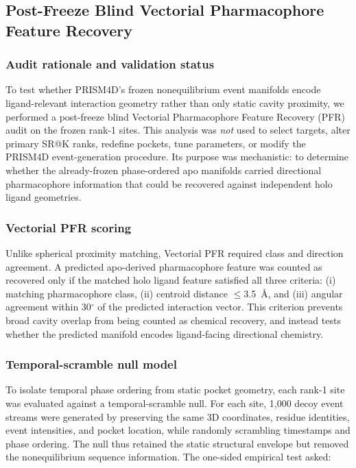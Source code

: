 \documentclass{sn-jnl}
\begin{document}
\subsection{Post-Freeze Blind Vectorial Pharmacophore Feature Recovery}
\label{sec:pfr}

\subsubsection{Audit rationale and validation status}

To test whether PRISM4D's frozen nonequilibrium event manifolds encode
ligand-relevant interaction geometry rather than only static cavity proximity,
we performed a post-freeze blind Vectorial Pharmacophore Feature Recovery (PFR)
audit on the frozen rank-1 sites. This analysis was \emph{not} used to select
targets, alter primary SR@K ranks, redefine pockets, tune parameters, or modify
the PRISM4D event-generation procedure. Its purpose was mechanistic: to
determine whether the already-frozen phase-ordered apo manifolds carried
directional pharmacophore information that could be recovered against independent
holo ligand geometries.

\subsubsection{Vectorial PFR scoring}

Unlike spherical proximity matching, Vectorial PFR required class and direction
agreement. A predicted apo-derived pharmacophore feature was counted as recovered
only if the matched holo ligand feature satisfied all three criteria: (i) matching
pharmacophore class, (ii) centroid distance $\leq$3.5~\AA{}, and (iii) angular
agreement within 30$^\circ$ of the predicted interaction vector. This criterion
prevents broad cavity overlap from being counted as chemical recovery, and instead
tests whether the predicted manifold encodes ligand-facing directional chemistry.

\subsubsection{Temporal-scramble null model}

To isolate temporal phase ordering from static pocket geometry, each rank-1 site
was evaluated against a temporal-scramble null. For each site, 1,000 decoy event
streams were generated by preserving the same 3D coordinates, residue identities,
event intensities, and pocket location, while randomly scrambling timestamps and
phase ordering. The null thus retained the static structural envelope but removed
the nonequilibrium sequence information. The one-sided empirical test asked:
\end{document}
